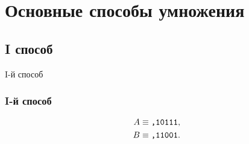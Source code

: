 \section{Основные способы умножения}


\subsection{I способ}

\begin{frame}
    \begin{center}
        I-й способ
    \end{center}
\end{frame}

\begin{frame}
    \frametitle{I-й способ}
    
    \begin{align*}
        A\equiv\texttt{,10111},\\
        B\equiv\texttt{,11001}.
    \end{align*}
    

\end{frame}
